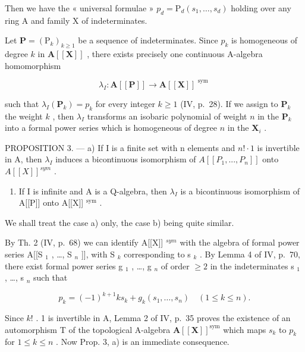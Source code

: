 Then we have the « universal formulae » \(p_d = \mathrm{P}_d(s_1, \ldots, s_d)\) holding over any ring A and family X of indeterminates.

Let \(\mathbf{P} = (\mathrm{P}_k)_{k\geqslant 1}\) be a sequence of indeterminates. Since \(p_k\) is homogeneous of degree \(k\) in \(\mathbf{A}[[\mathbf{X}]]\) , there exists precisely one continuous A-algebra homomorphism

\[
\lambda_ {I}: \mathbf {A} [ [ \mathbf {P} ] ] \rightarrow \mathbf {A} [ [ \mathbf {X} ] ] ^ {\text { sym }}
\]

such that \(\lambda_{I}(\mathbf{P}_{k}) = p_{k}\) for every integer \(k \geqslant 1\) (IV, p.~28). If we assign to \(\mathbf{P}_{k}\) the weight \(k\) , then \(\lambda_{I}\) transforms an isobaric polynomial of weight \(n\) in the \(\mathbf{P}_{k}\) into a formal power series which is homogeneous of degree \(n\) in the \(\mathbf{X}_{i}\) .

PROPOSITION 3. --- a) If I is a finite set with n elements and \(n! \cdot 1\) is invertible in A, then \(\lambda_{I}\) induces a bicontinuous isomorphism of \(A[[P_{1}, ..., P_{n}]]\) onto \(A[[X]]^{sym}\) .

\begin{enumerate}
\def\labelenumi{\alph{enumi})}
\setcounter{enumi}{1}
\tightlist
\item
  If I is infinite and A is a Q-algebra, then \(\lambda_{I}\) is a bicontinuous isomorphism of A{[}{[}P{]}{]} onto A{[}{[}X{]}{]} \(^{\text{sym}}\) .
\end{enumerate}

We shall treat the case a) only, the case b) being quite similar.

By Th. 2 (IV, p.~68) we can identify A{[}{[}X{]}{]} \(^{sym}\) with the algebra of formal power series A{[}{[}S \(_1\) , \ldots, S \(_n\) {]}{]}, with S \(_k\) corresponding to s \(_k\) . By Lemma 4 of IV, p.~70, there exist formal power series g \(_1\) , \ldots, g \(_n\) of order \(\geqslant 2\) in the indeterminates s \(_1\) , \ldots, s \(_n\) such that

\[
p _ {k} = (- 1) ^ {k + 1} k s _ {k} + g _ {k} (s _ {1}, \dots , s _ {n}) \quad (1 \leqslant k \leqslant n).
\]

Since \(k!\) . 1 is invertible in A, Lemma 2 of IV, p.~35 proves the existence of an automorphism T of the topological A-algebra \(\mathbf{A}[[\mathbf{X}]]^{\mathrm{sym}}\) which maps \(s_k\) to \(p_k\) for \(1 \leqslant k \leqslant n\) . Now Prop. 3, a) is an immediate consequence.

